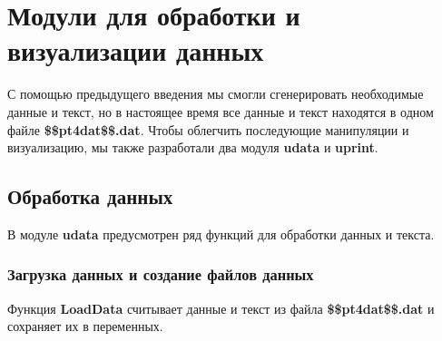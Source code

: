 \section{Модули для обработки и визуализации данных}
С помощью предыдущего введения мы смогли сгенерировать необходимые данные и текст, но в настоящее время все данные и текст находятся в одном файле \textbf{\$\$pt4dat\$\$.dat}. Чтобы облегчить последующие манипуляции и визуализацию, мы также разработали два модуля \textbf{udata} и \textbf{uprint}.
\subsection{Обработка данных}
В модуле \textbf{udata} предусмотрен ряд функций для обработки данных и текста.
\subsubsection{Загрузка данных и создание файлов данных}
Функция \textbf{LoadData} считывает данные и текст из файла \textbf{\$\$pt4dat\$\$.dat} и сохраняет их в переменных.

